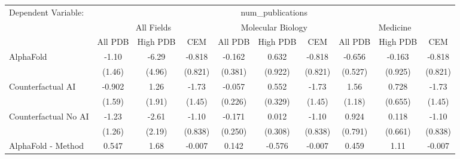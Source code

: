 \begingroup
\centering
\begin{tabular}{lccccccccc}
   \tabularnewline \midrule \midrule
   Dependent Variable: & \multicolumn{9}{c}{num\_publications}\\
 & \multicolumn{3}{c}{All Fields} & \multicolumn{3}{c}{Molecular Biology} & \multicolumn{3}{c}{Medicine} \\
\cmidrule(lr){2-7} \cmidrule(lr){5-10} \cmidrule(lr){8-7}
 & \multicolumn{1}{c}{All PDB} & \multicolumn{1}{c}{High PDB} & \multicolumn{1}{c}{CEM} & \multicolumn{1}{c}{All PDB} & \multicolumn{1}{c}{High PDB} & \multicolumn{1}{c}{CEM} & \multicolumn{1}{c}{All PDB} & \multicolumn{1}{c}{High PDB} & \multicolumn{1}{c}{CEM} \\
\cmidrule(lr){2-3} \cmidrule(lr){3-4} \cmidrule(lr){4-5} \cmidrule(lr){5-6} \cmidrule(lr){6-7} \cmidrule(lr){7-8} \cmidrule(lr){8-9} \cmidrule(lr){9-10} \cmidrule(lr){10-3}
   AlphaFold                                                   & -1.10            & -6.29           & -0.818         & -0.162        & 0.632         & -0.818         & -0.656        & -0.163        & -0.818\\   
                                                               & (1.46)           & (4.96)          & (0.821)        & (0.381)       & (0.922)       & (0.821)        & (0.527)       & (0.925)       & (0.821)\\   
   Counterfactual AI                                           & -0.902           & 1.26            & -1.73          & -0.057        & 0.552         & -1.73          & 1.56          & 0.728         & -1.73\\   
                                                               & (1.59)           & (1.91)          & (1.45)         & (0.226)       & (0.329)       & (1.45)         & (1.18)        & (0.655)       & (1.45)\\   
   Counterfactual No AI                                        & -1.23            & -2.61           & -1.10          & -0.171        & 0.012         & -1.10          & 0.924         & 0.118         & -1.10\\   
                                                               & (1.26)           & (2.19)          & (0.838)        & (0.250)       & (0.308)       & (0.838)        & (0.791)       & (0.661)       & (0.838)\\   
   AlphaFold - Method                                          & 0.547            & 1.68            & -0.007         & 0.142         & -0.576        & -0.007         & 0.459         & 1.11          & -0.007\\   

\end{tabular}
